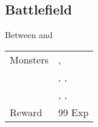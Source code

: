 \subsection{Battlefield}
\label{map:battlefield_08}

Between  and 

\noindent\begin{tabularx}{\textwidth}[l]{lX}
	Monsters
	& \nameref{monster:edgehog}, \nameref{monster:edgehog} \\
	& \nameref{monster:edgehog}, \nameref{monster:edgehog}, \nameref{monster:scorpion} \\
	& \nameref{monster:scorpion}, \nameref{monster:scorpion}, \nameref{monster:giant_toad}
\\ \hline
	Reward & 99 Exp
\end{tabularx}
